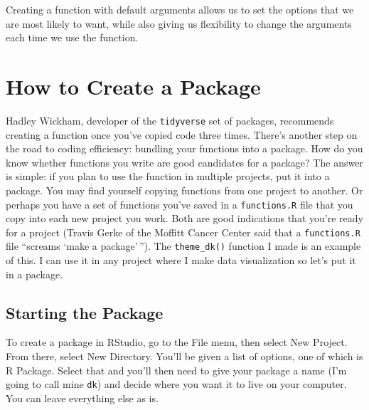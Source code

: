 \documentclass[
]{book}
\begin{document}
Creating a function with default arguments allows us to set the options that we are most likely to want, while also giving us flexibility to change the arguments each time we use the function.

\hypertarget{how-to-create-a-package}{%
\section*{How to Create a Package}\label{how-to-create-a-package}}

Hadley Wickham, developer of the \texttt{tidyverse} set of packages, recommends creating a function once you've copied code three times. There's another step on the road to coding efficiency: bundling your functions into a package. How do you know whether functions you write are good candidates for a package? The answer is simple: if you plan to use the function in multiple projects, put it into a package. You may find yourself copying functions from one project to another. Or perhaps you have a set of functions you've saved in a \texttt{functions.R} file that you copy into each new project you work. Both are good indications that you're ready for a project (Travis Gerke of the Moffitt Cancer Center said that a \texttt{functions.R} file ``screams `make a package'\,''). The \texttt{theme\_dk()} function I made is an example of this. I can use it in any project where I make data visualization so let's put it in a package.

\hypertarget{starting-the-package}{%
\subsection*{Starting the Package}\label{starting-the-package}}

To create a package in RStudio, go to the File menu, then select New Project. From there, select New Directory. You'll be given a list of options, one of which is R Package. Select that and you'll then need to give your package a name (I'm going to call mine \texttt{dk}) and decide where you want it to live on your computer. You can leave everything else as is.
\end{document}
